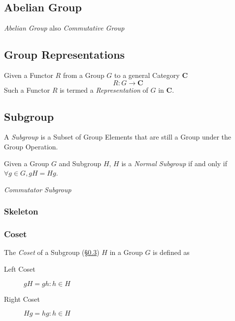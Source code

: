 \subsection{Abelian Group}\label{subsec:abelian_group}

\emph{Abelian Group} also \emph{Commutative Group}



\subsection{Group Representations}\label{subsec:group_representation}

Given a Functor $R$ from a Group $G$ to a general Category
$\mathbf{C}$
\[
    R : G \rightarrow \mathbf{C}
\]
Such a Functor $R$ is termed a \emph{Representation} of $G$ in
$\mathbf{C}$.



\subsection{Subgroup}\label{subsec:subgroup}

A \emph{Subgroup} is a Subset of Group Elements that are still a Group
under the Group Operation.

Given a Group $G$ and Subgroup $H$, $H$ is a \emph{Normal Subgroup} if
and only if $\forall g \in G, gH = Hg$.

\emph{Commutator Subgroup}

\subsubsection{Skeleton}

\subsubsection{Coset}\label{subsec:group_coset}

The \emph{Coset} of a Subgroup (\S\ref{subsec:subgroup}) $H$ in a Group $G$
is defined as
\begin{description}
\item[Left Coset] $gH = {gh : h \in H}$
\item[Right Coset] $Hg = {hg : h \in H}$
\end{description}


